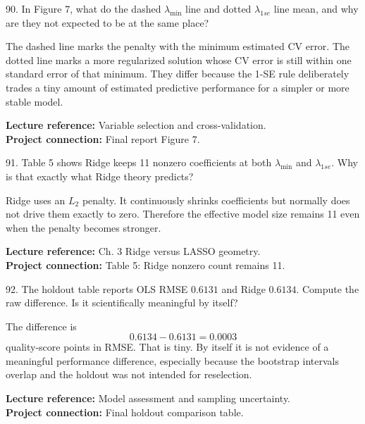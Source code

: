 \documentclass[10.5pt,a4paper]{article}
\newcommand{\chapref}[1]{\textbf{Lecture reference:} #1}
\newcommand{\projectref}[1]{\textbf{Project connection:} #1}
\begin{document}
\begin{qbox}{90. In Figure 7, what do the dashed \(\lambda_{\min}\) line and dotted \(\lambda_{1se}\) line mean, and why are they not expected to be at the same place?}
\end{qbox}
\begin{answerbox}
The dashed line marks the penalty with the minimum estimated CV error. The dotted line marks a more regularized solution whose CV error is still within one standard error of that minimum. They differ because the 1-SE rule deliberately trades a tiny amount of estimated predictive performance for a simpler or more stable model.
\end{answerbox}
\begin{refbox}\chapref{Variable selection and cross-validation.}\\\projectref{Final report Figure 7.}\end{refbox}

\begin{qbox}{91. Table 5 shows Ridge keeps 11 nonzero coefficients at both \(\lambda_{\min}\) and \(\lambda_{1se}\). Why is that exactly what Ridge theory predicts?}
\end{qbox}
\begin{answerbox}
Ridge uses an \(L_2\) penalty. It continuously shrinks coefficients but normally does not drive them exactly to zero. Therefore the effective model size remains 11 even when the penalty becomes stronger.
\end{answerbox}
\begin{refbox}\chapref{Ch. 3 Ridge versus LASSO geometry.}\\\projectref{Table 5: Ridge nonzero count remains 11.}\end{refbox}

\begin{qbox}{92. The holdout table reports OLS RMSE \(0.6131\) and Ridge \(0.6134\). Compute the raw difference. Is it scientifically meaningful by itself?}
\end{qbox}
\begin{answerbox}
The difference is
\[
0.6134-0.6131=0.0003
\]
quality-score points in RMSE. That is tiny. By itself it is not evidence of a meaningful performance difference, especially because the bootstrap intervals overlap and the holdout was not intended for reselection.
\end{answerbox}
\begin{refbox}\chapref{Model assessment and sampling uncertainty.}\\\projectref{Final holdout comparison table.}\end{refbox}
\end{document}
